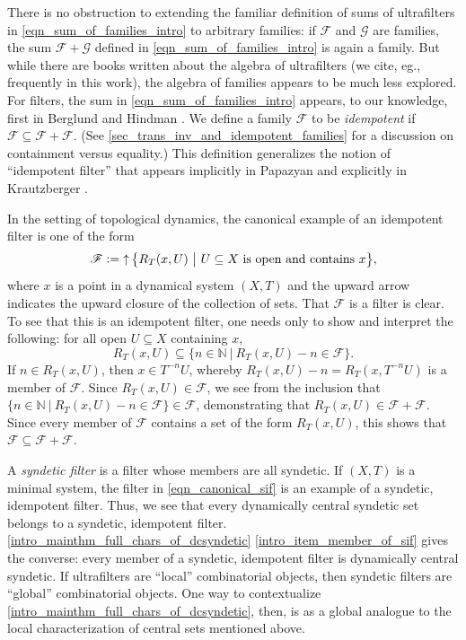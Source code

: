 \documentclass[letter,11pt]{article}
\theoremstyle{plain}
\theoremstyle{definition}
\theoremstyle{plain}
\theoremstyle{plain}
\numberwithin{equation}{section}
\newcommand{\N}{\mathbb{N}}
\newcommand{\defeq}{\vcentcolon=}
\DeclareMathOperator{\upclose}{\uparrow}
\newcommand{\family}{\mathscr{F}}
\newcommand{\familytwo}{\mathscr{G}}
\begin{document}
There is no obstruction to extending the familiar definition of sums of ultrafilters in \eqref{eqn_sum_of_families_intro} to arbitrary families: if $\family$ and $\familytwo$ are families, the sum $\family + \familytwo$ defined in \eqref{eqn_sum_of_families_intro} is again a family.  But while there are books written about the algebra of ultrafilters (we cite, eg., \cite{hindman_strauss_book_2012} frequently in this work), the algebra of families appears to be much less explored. For filters, the sum in \eqref{eqn_sum_of_families_intro} appears, to our knowledge, first in Berglund and Hindman \cite{berglund_hindman_1984}. We define a family $\family$ to be \emph{idempotent} if $\family \subseteq \family + \family$.  (See \cref{sec_trans_inv_and_idempotent_families} for a discussion on containment versus equality.) This definition generalizes the notion of ``idempotent filter'' that appears implicitly in Papazyan \cite{papazyan_1989} and explicitly in Krautzberger \cite{Krautzberger_2009}.

In the setting of topological dynamics, the canonical example of an idempotent filter is one of the form
\begin{align}
\label{eqn_canonical_sif}
    \family \defeq \upclose \big\{ R_T(x,U) \ \big| \ U \subseteq X \text{ is open and contains $x$} \big\},
\end{align}
where $x$ is a point in a dynamical system $(X,T)$ and the upward arrow indicates the upward closure of the collection of sets.  That $\family$ is a filter is clear.  To see that this is an idempotent filter, one needs only to show and interpret the following: for all open $U \subseteq X$ containing $x$,
\[R_T(x,U) \subseteq \big\{n \in \N \ \big| \ R_T(x,U) - n \in \family\big\}.\]
If $n \in R_T(x,U)$, then $x \in T^{-n}U$, whereby $R_T(x,U) - n = R_T(x,T^{-n}U)$ is a member of $\family$.  Since $R_T(x,U) \in \family$, we see from the inclusion that $\{n \in \N \ | \ R_T(x,U) - n \in \family\} \in \family$, demonstrating that $R_T(x,U) \in \family + \family$.  Since every member of $\family$ contains a set of the form $R_T(x,U)$, this shows that $\family \subseteq \family + \family$.

A \emph{syndetic filter} is a filter whose members are all syndetic.  If $(X,T)$ is a minimal system, the filter in \eqref{eqn_canonical_sif} is an example of a syndetic, idempotent filter.  Thus, we see that every dynamically central syndetic set belongs to a syndetic, idempotent filter. \cref{intro_mainthm_full_chars_of_dcsyndetic} \eqref{intro_item_member_of_sif} gives the converse: every member of a syndetic, idempotent filter is dynamically central syndetic.  If ultrafilters are ``local'' combinatorial objects, then syndetic filters are ``global'' combinatorial objects.  One way to contextualize \cref{intro_mainthm_full_chars_of_dcsyndetic}, then, is as a global analogue to the local characterization of central sets mentioned above.\\
\end{document}
